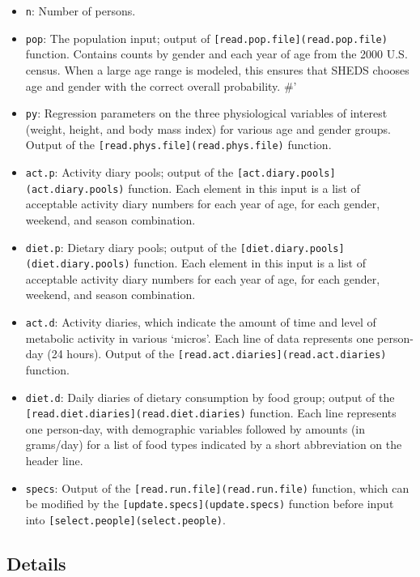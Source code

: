 \documentclass[
]{article}
\providecommand{\tightlist}{%
  \setlength{\itemsep}{0pt}\setlength{\parskip}{0pt}}
\begin{document}
\begin{itemize}
\tightlist
\item
  \texttt{n}: Number of persons.
\item
  \texttt{pop}: The population input; output of
  \texttt{{[}read.pop.file{]}(read.pop.file)} function. Contains counts
  by gender and each year of age from the 2000 U.S. census. When a large
  age range is modeled, this ensures that SHEDS chooses age and gender
  with the correct overall probability. \#'
\item
  \texttt{py}: Regression parameters on the three physiological
  variables of interest (weight, height, and body mass index) for
  various age and gender groups. Output of the
  \texttt{{[}read.phys.file{]}(read.phys.file)} function.
\item
  \texttt{act.p}: Activity diary pools; output of the
  \texttt{{[}act.diary.pools{]}(act.diary.pools)} function. Each element
  in this input is a list of acceptable activity diary numbers for each
  year of age, for each gender, weekend, and season combination.
\item
  \texttt{diet.p}: Dietary diary pools; output of the
  \texttt{{[}diet.diary.pools{]}(diet.diary.pools)} function. Each
  element in this input is a list of acceptable activity diary numbers
  for each year of age, for each gender, weekend, and season
  combination.
\item
  \texttt{act.d}: Activity diaries, which indicate the amount of time
  and level of metabolic activity in various `micros'. Each line of data
  represents one person-day (24 hours). Output of the
  \texttt{{[}read.act.diaries{]}(read.act.diaries)} function.
\item
  \texttt{diet.d}: Daily diaries of dietary consumption by food group;
  output of the \texttt{{[}read.diet.diaries{]}(read.diet.diaries)}
  function. Each line represents one person-day, with demographic
  variables followed by amounts (in grams/day) for a list of food types
  indicated by a short abbreviation on the header line.
\item
  \texttt{specs}: Output of the
  \texttt{{[}read.run.file{]}(read.run.file)} function, which can be
  modified by the \texttt{{[}update.specs{]}(update.specs)} function
  before input into \texttt{{[}select.people{]}(select.people)}.
\end{itemize}

\hypertarget{details-27}{%
\subsection{Details}\label{details-27}}
\end{document}
